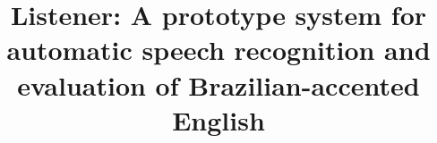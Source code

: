 \documentclass[twocolumn]{bmcart}%
\begin{document}
\begin{frontmatter}
\thispagestyle{plain}
\begin{fmbox}

\title{Listener: A prototype system for automatic speech recognition and evaluation of
Brazilian-accented English}


\author[
   addressref={aff1},                   %
   corref={aff1},                       %
   email={gustavoauma@gmail.com}   %
]{ }
\author[
   addressref={aff1},
   corref={aff1},
   email={sandram@icmc.usp.br}
]{ }


\address[id=aff1]{%
  , %
  ,                     %
  ,                              %
}


\end{fmbox}
\end{frontmatter}
\end{document}
